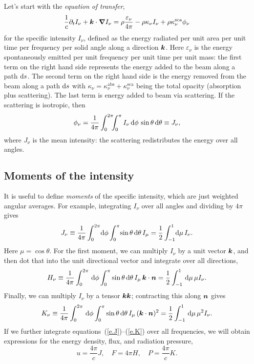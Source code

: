 Let's start with the \emph{equation of transfer},
\begin{equation}\label{e.transfer}
\frac{1}{c}\partial_{t}I_{\nu} + \boldsymbol{k}\cdot\boldsymbol{\nabla} I_{\nu} = \rho \frac{\varepsilon_{\nu}}{4\pi} - \rho\kappa_{\nu} I_{\nu} + \rho\kappa_{\nu}^{\mathrm{sca}}\phi_{\nu}
\end{equation}
for the specific intensity $I_{\nu}$, defined as the energy radiated per unit area per unit time per frequency per solid angle along a direction $\boldsymbol{k}$. Here $\varepsilon_{\nu}$ is the energy spontaneously emitted per unit frequency per unit time per unit mass: the first term on the right hand side represents the energy added to the beam along a path $\mathrm{d} s$.  The second term on the right hand side is the energy removed from the beam along a path $\mathrm{d} s$ with $\kappa_{\nu} = \kappa_{\nu}^{\mathrm{abs}} + \kappa_{\nu}^{\mathrm{sca}}$ being the total opacity (absorption plus scattering). The last term is energy added to beam via scattering.  If the scattering is isotropic, then
\begin{equation}\label{e.isosca}
\phi_{\nu} = \frac{1}{4\pi}\int_{0}^{2\pi}\!\!\!\int_{0}^{\pi} I_{\nu}\,\mathrm{d}\phi\,\sin\theta\,\mathrm{d}\theta \equiv J_{\nu},
\end{equation}
where $J_{\nu}$ is the mean intensity: the scattering redistributes the energy over all angles.

\subsection{Moments of the intensity}
It is useful to define \emph{moments} of the specific intensity, which are just weighted angular averages.  For example, integrating $I_{\nu}$ over all angles and dividing by $4\pi$ gives
\begin{equation}\label{e.J}
J_{\nu} \equiv \frac{1}{4\pi}\int_{0}^{2\pi}\!\mathrm{d}\phi\int_{0}^{\pi}\!\sin\theta\,\mathrm{d}\theta\, I_{\mu} = \frac{1}{2}\int_{-1}^{1} \!\mathrm{d}\mu \,I_{\nu}.
\end{equation}
Here $\mu = \cos\theta$. For the first moment, we can multiply $I_{\nu}$ by a unit vector $\boldsymbol{k}$, and then dot that into the unit directional vector and integrate over all directions,
\begin{equation}\label{e.H}
H_{\nu} \equiv \frac{1}{4\pi}\int_{0}^{2\pi}\,\mathrm{d}\phi\int_{0}^{\pi}\sin\theta\,\mathrm{d}\theta\, I_{\mu}\,\boldsymbol{k}\cdot\boldsymbol{n} = \frac{1}{2}\int_{-1}^{1} \,\mathrm{d}\mu \,\mu I_{\nu}.
\end{equation}
Finally, we can multiply $I_{\nu}$ by a tensor $\boldsymbol{k}\boldsymbol{k}$; contracting this along $\boldsymbol{n}$ gives
\begin{equation}\label{e.K}
K_{\nu} \equiv \frac{1}{4\pi}\int_{0}^{2\pi}\,\mathrm{d}\phi\int_{0}^{\pi}\sin\theta\,\mathrm{d}\theta\, I_{\mu}\,(\boldsymbol{k}\cdot\boldsymbol{n})^{2} = \frac{1}{2}\int_{-1}^{1} \,\mathrm{d}\mu \,\mu^{2} I_{\nu}.
\end{equation}
If we further integrate equations~(\ref{e.J})--(\ref{e.K}) over all frequencies, we will obtain expressions for the energy density, flux, and radiation pressure,
\begin{equation}\label{e.thermal}
u = \frac{4\pi}{c}J,\quad F = 4\pi H,\quad P = \frac{4\pi}{c}K.
\end{equation}

